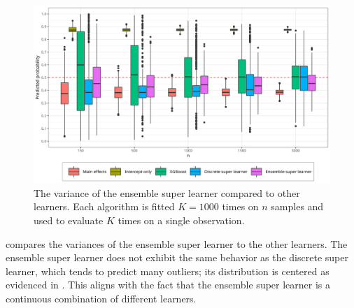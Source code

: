 \documentclass[./main.tex]{subfiles}
\begin{document}
\begin{figure}[H]
    \centering
    \includegraphics[width=\textwidth]{figures/learner_vars_w_esl_1000.png}
    \caption{The variance of the ensemble super learner compared to other learners. Each algorithm is fitted $ K = 1000 $ times on $n$ samples and used to evaluate $ K $ times on a single observation.}
    \label{fig:learner_vars_w_esl_1000}
\end{figure}
 compares the variances of the ensemble super learner to the other learners. The ensemble super learner does not exhibit the same behavior as the discrete super learner, which tends to predict many outliers; its distribution is centered as evidenced in . This aligns with the fact that the ensemble super learner is a continuous combination of different learners. 
\end{document}

